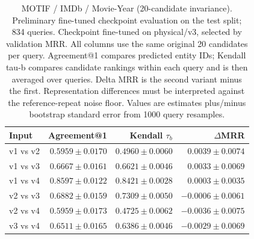 \begin{table}[t]
\centering
\small
\begin{tabular}{lrrr}
\toprule
Input & Agreement@1 & Kendall $\tau_b$ & $\Delta$MRR \\
\midrule
v1 vs v2 & $0.5959 \pm 0.0170$ & $0.4960 \pm 0.0060$ & $0.0039 \pm 0.0074$ \\
v1 vs v3 & $0.6667 \pm 0.0161$ & $0.6621 \pm 0.0046$ & $0.0033 \pm 0.0069$ \\
v1 vs v4 & $0.8597 \pm 0.0122$ & $0.8421 \pm 0.0028$ & $0.0003 \pm 0.0035$ \\
v2 vs v3 & $0.6882 \pm 0.0159$ & $0.7309 \pm 0.0050$ & $-0.0006 \pm 0.0061$ \\
v2 vs v4 & $0.5959 \pm 0.0173$ & $0.4725 \pm 0.0062$ & $-0.0036 \pm 0.0075$ \\
v3 vs v4 & $0.6511 \pm 0.0165$ & $0.6386 \pm 0.0046$ & $-0.0029 \pm 0.0069$ \\
\bottomrule
\end{tabular}
\caption{MOTIF / IMDb / Movie-Year (20-candidate invariance). Preliminary fine-tuned checkpoint evaluation on the test split; 834 queries. Checkpoint fine-tuned on physical/v3, selected by validation MRR. All columns use the same original 20 candidates per query. Agreement@1 compares predicted entity IDs; Kendall tau-b compares candidate rankings within each query and is then averaged over queries. Delta MRR is the second variant minus the first. Representation differences must be interpreted against the reference-repeat noise floor. Values are estimates plus/minus bootstrap standard error from 1000 query resamples.}
\label{tab:motif-movie_year-invariance}
\end{table}
